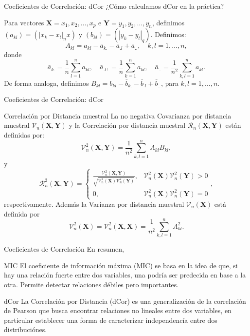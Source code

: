 \documentclass{beamer}
\begin{document}
\begin{frame}{Coeficientes de Correlación: dCor}
    ¿Cómo calculamos dCor en la práctica?
    \pause

    Para vectores $\mathbf{X} = x_1, x_2, \dots, x_p$ e $\mathbf{Y} = y_1, y_2, \dots, y_n$, definimos $\left(a_{k l}\right)=\left(\left|x_k-x_l\right|_nx\right)$ y $\left(b_{k l}\right)=\left(\left|y_k-y_l\right|_q\right)$. Definimos:
    \pause
	$$
	A_{k l}=a_{k l}-\bar{a}_{k .}-\bar{a}_{. l}+\bar{a}_{. .}, \quad k, l=1, \ldots, n,
	$$
	donde
	$$
	\bar{a}_{k .}=\frac{1}{n} \sum_{l=1}^n a_{k l}, \quad \bar{a}_{. l},=\frac{1}{n} \sum_{k=1}^n a_{k l}, \quad \bar{a}_{. .}=\frac{1}{n^2} \sum_{k, l=1}^n a_{k l} .
	$$
	\pause
	De forma analoga, definimos $B_{k l}=b_{k l}-\bar{b}_{k .}-\bar{b}_{\cdot l}+\bar{b}_{. .}$, para $k, l=1, \ldots, n$.
\end{frame}

\begin{frame}{Coeficientes de Correlación: dCor}
    \begin{block}{Correlaci\'on por Distancia muestral}
        La no negativa Covarianza por distancia muestral $\mathcal{V}_n(\mathbf{X}, \mathbf{Y})$ y la Correlaci\'on por distancia muestral $\mathcal{R}_n(\mathbf{X}, \mathbf{Y})$ están definidas por:
        $$
        \mathcal{V}_n^2(\mathbf{X}, \mathbf{Y})=\frac{1}{n^2} \sum_{k, l=1}^n A_{k l} B_{k l},
        $$
        y
        $$
        \mathcal{R}_n^2(\mathbf{X}, \mathbf{Y})= \begin{cases}\frac{\mathcal{V}_n^2(\mathbf{X}, \mathbf{Y})}{\sqrt{\mathcal{V}_n^2(\mathbf{X}) \mathcal{V}_n^2(\mathbf{Y})}}, & \mathcal{V}_n^2(\mathbf{X}) \mathcal{V}_n^2(\mathbf{Y})>0 \\ 0, & \mathcal{V}_n^2(\mathbf{X}) \mathcal{V}_n^2(\mathbf{Y})=0\end{cases},
        $$
        respectivamente. Adem\'as la Varianza por distancia muestral $\mathcal{V}_n(\mathbf{X})$ est\'a definida por
        $$
        \mathcal{V}_n^2(\mathbf{X})=\mathcal{V}_n^2(\mathbf{X}, \mathbf{X})=\frac{1}{n^2} \sum_{k, l=1}^n A_{k l}^2 .
        $$
    \end{block}
\end{frame}

\begin{frame}{Coeficientes de Correlación}
    En resumen, 
    \pause
    \begin{block}{MIC}
        El coeficiente de información máxima (MIC) se basa en la idea de que, si hay una relación fuerte entre dos variables, una podría ser predecida en base a la otra. Permite detectar relaciones débiles pero importantes.
    \end{block}
    \pause
    \begin{block}{dCor}
        La Correlación por Distancia (dCor) es una generalización de la correlación de Pearson que busca encontrar relaciones no lineales entre dos variables, en particular establecer una forma de caracterizar independencía entre dos distribuciónes.
    \end{block}
\end{frame}
\end{document}
